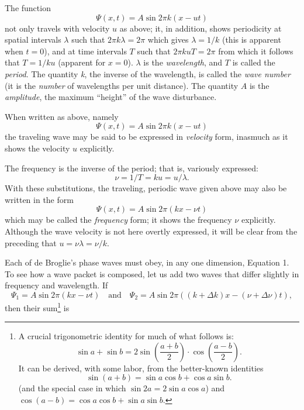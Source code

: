 The function
\begin{equation*}
\Psi(x,t) = A \sin 2\pi k(x-ut)
\end{equation*}
not only travels with velocity $u$ as above; it, in addition, shows
periodicity at spatial intervals $\lambda$ such that $2\pi k\lambda = 2\pi$ 
which gives $\lambda = 1/k$ (this is apparent when
$t = 0$), and at time intervals $T$ such that $2\pi kuT = 2\pi$ 
from which it follows that $T = 1/ku$ (apparent
for $x = 0$). $\lambda$ is the \emph{wavelength}, and $T$ is
called the \emph{period}. The quantity \emph{k}, the inverse of
the wavelength, is called the \emph{wave number} (it is the
\emph{number} of wavelengths per unit distance). The quantity $A$
is the \emph{amplitude}, the maximum ``height'' of the wave disturbance.

When written as above, namely
\begin{equation*}
\Psi(x,t) = A \sin 2\pi k(x-ut)
\end{equation*}
the traveling wave may be said to be expressed in \emph{velocity} form,
inasmuch as it shows the velocity $u$ explicitly.

The frequency is the inverse of the period; that is, variously
expressed:
\begin{equation*}
\nu = 1/T = ku = u/\lambda .
\end{equation*}
With these substitutions, the traveling, periodic wave given above may
also be written in the form
\begin{equation*}\tag{1}
\Psi(x,t) = A \sin 2\pi(kx-\nu t)
\end{equation*}
which may be called the \emph{frequency} form; it shows the frequency
$\nu$ explicitly. Although the wave velocity is not here overtly
expressed, it will be clear from the preceding that $u = \nu\lambda = \nu/k$.

Each of de Broglie's phase waves must obey, in any one dimension,
Equation 1. To see how a wave packet is composed, let us add two waves
that differ slightly in frequency and wavelength. If
\begin{equation*}
\Psi_1  = A\sin 2\pi(kx-\nu t)\quad\text{and}\quad\Psi_2 = 
A\sin 2\pi((k+\Delta k)x - (\nu + \Delta\nu)t),
\end{equation*}
then their sum\footnote{A crucial trigonometric identity for much of
  what follows is: 
  \begin{equation*}
  \sin a + \sin b = 2 \sin\left(\frac{a+b}{2}\right)\cdot\cos\left(\frac{a-b}{2}\right) .
  \end{equation*}
  It can be derived, with some labor, from the better-known identities
  \begin{equation*}
  \sin{(a+b)} = \sin a\cos b + \cos a\sin b.
  \end{equation*}
  (and the special case in which $\sin{2a} = 2\sin{a}\cos{a}$) and
  $\cos{(a-b)} = \cos{a}\cos{b} + \sin{a}\sin{b}.$} is


